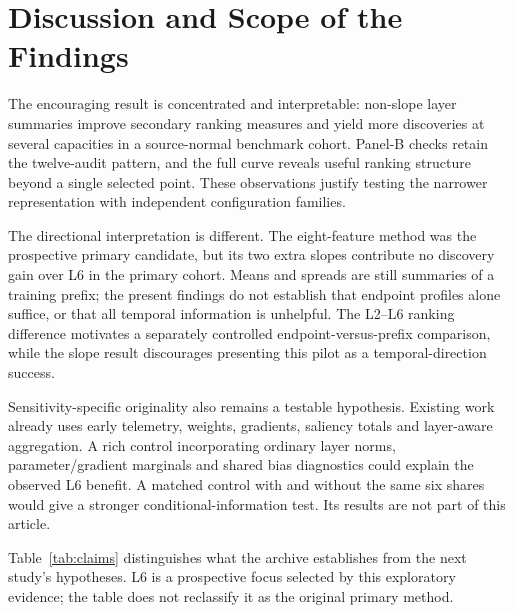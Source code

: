 \documentclass[nolineno]{ieeeaccess}
\begin{document}
\section{Discussion and Scope of the Findings}
\label{sec:discussion}
The encouraging result is concentrated and interpretable: non-slope layer summaries improve secondary ranking measures and yield more discoveries at several capacities in a source-normal benchmark cohort. Panel-B checks retain the twelve-audit pattern, and the full curve reveals useful ranking structure beyond a single selected point. These observations justify testing the narrower representation with independent configuration families.

The directional interpretation is different. The eight-feature method was the prospective primary candidate, but its two extra slopes contribute no discovery gain over L6 in the primary cohort. Means and spreads are still summaries of a training prefix; the present findings do not establish that endpoint profiles alone suffice, or that all temporal information is unhelpful. The L2--L6 ranking difference motivates a separately controlled endpoint-versus-prefix comparison, while the slope result discourages presenting this pilot as a temporal-direction success.

Sensitivity-specific originality also remains a testable hypothesis. Existing work already uses early telemetry, weights, gradients, saliency totals and layer-aware aggregation. A rich control incorporating ordinary layer norms, parameter/gradient marginals and shared bias diagnostics could explain the observed L6 benefit. A matched control with and without the same six shares would give a stronger conditional-information test. Its results are not part of this article.

Table~\ref{tab:claims} distinguishes what the archive establishes from the next study's hypotheses. L6 is a prospective focus selected by this exploratory evidence; the table does not reclassify it as the original primary method.
\end{document}
